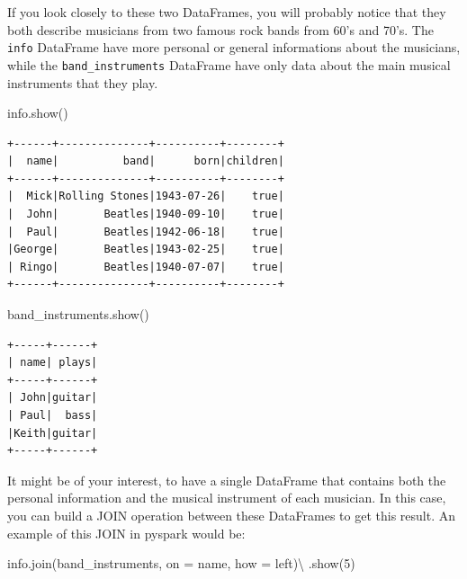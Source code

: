 \documentclass[
  11pt,
  letterpaper,
  DIV=11,
  numbers=noendperiod]{scrreprt}
\newenvironment{Shaded}{\begin{snugshade}}{\end{snugshade}}
\newcommand{\DecValTok}[1]{\textcolor[rgb]{0.68,0.00,0.00}{#1}}
\newcommand{\NormalTok}[1]{\textcolor[rgb]{0.00,0.23,0.31}{#1}}
\newcommand{\OperatorTok}[1]{\textcolor[rgb]{0.37,0.37,0.37}{#1}}
\newcommand{\StringTok}[1]{\textcolor[rgb]{0.13,0.47,0.30}{#1}}
\begin{document}
If you look closely to these two DataFrames, you will probably notice
that they both describe musicians from two famous rock bands from 60's
and 70's. The \texttt{info} DataFrame have more personal or general
informations about the musicians, while the \texttt{band\_instruments}
DataFrame have only data about the main musical instruments that they
play.

\begin{Shaded}
\begin{Highlighting}[]
\NormalTok{info.show()}
\end{Highlighting}
\end{Shaded}

\begin{verbatim}
+------+--------------+----------+--------+
|  name|          band|      born|children|
+------+--------------+----------+--------+
|  Mick|Rolling Stones|1943-07-26|    true|
|  John|       Beatles|1940-09-10|    true|
|  Paul|       Beatles|1942-06-18|    true|
|George|       Beatles|1943-02-25|    true|
| Ringo|       Beatles|1940-07-07|    true|
+------+--------------+----------+--------+
\end{verbatim}

\begin{Shaded}
\begin{Highlighting}[]
\NormalTok{band\_instruments.show()}
\end{Highlighting}
\end{Shaded}

\begin{verbatim}
+-----+------+
| name| plays|
+-----+------+
| John|guitar|
| Paul|  bass|
|Keith|guitar|
+-----+------+
\end{verbatim}

It might be of your interest, to have a single DataFrame that contains
both the personal information and the musical instrument of each
musician. In this case, you can build a JOIN operation between these
DataFrames to get this result. An example of this JOIN in pyspark would
be:

\begin{Shaded}
\begin{Highlighting}[]
\NormalTok{info.join(band\_instruments, on }\OperatorTok{=} \StringTok{\textquotesingle{}name\textquotesingle{}}\NormalTok{, how }\OperatorTok{=} \StringTok{\textquotesingle{}left\textquotesingle{}}\NormalTok{)}\OperatorTok{\textbackslash{}}
\NormalTok{    .show(}\DecValTok{5}\NormalTok{)}
\end{Highlighting}
\end{Shaded}
\end{document}

